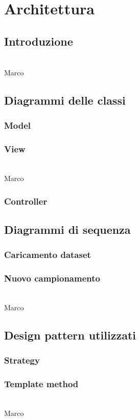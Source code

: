 \chapter{Architettura}
\section{Introduzione}
\\Marco
\section{Diagrammi delle classi}
\subsection{Model}
\subsection{View}
\\Marco
\subsection{Controller}
\section{Diagrammi di sequenza}
\subsection{Caricamento dataset}
\subsection{Nuovo campionamento}
\\Marco
\section{Design pattern utilizzati}
\subsection{Strategy}
\subsection{Template method}
\\Marco
